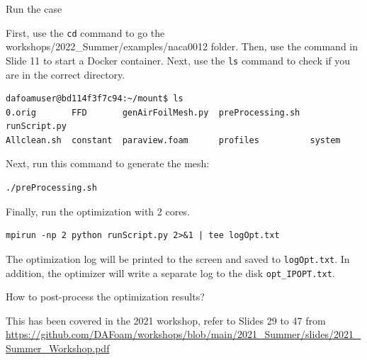 \documentclass{bredelebeamer}
\begin{document}
\begin{frame}[fragile]{Run the case}

  First, use the \texttt{cd} command to go the workshops/2022\_Summer/examples/naca0012 folder. Then, use the command in Slide 11 to start a Docker container. Next, use the \texttt{ls} command to check if you are in the correct directory.
  \footnotesize
  \lstset{ language=bash }
  \begin{lstlisting}
dafoamuser@bd114f3f7c94:~/mount$ ls
0.orig       FFD       genAirFoilMesh.py  preProcessing.sh  runScript.py
Allclean.sh  constant  paraview.foam      profiles          system
  \end{lstlisting}
  \normalsize

  Next, run this command to generate the mesh:
  \footnotesize
  \lstset{ language=bash }
  \begin{lstlisting}
./preProcessing.sh
  \end{lstlisting}
  \normalsize

  Finally, run the optimization with 2 cores.
  \footnotesize
  \lstset{ language=bash }
  \begin{lstlisting}
mpirun -np 2 python runScript.py 2>&1 | tee logOpt.txt
  \end{lstlisting}
  \normalsize

  The optimization log will be printed to the screen and saved to \texttt{logOpt.txt}. In addition, the optimizer will write a separate log to the disk \texttt{opt\_IPOPT.txt}.

\end{frame}

\begin{frame}[fragile]{How to post-process the optimization results?}

  This has been covered in the 2021 workshop, refer to Slides 29 to 47 from 
  \url{https://github.com/DAFoam/workshops/blob/main/2021_Summer/slides/2021_Summer_Workshop.pdf}

\end{frame}
\end{document}

